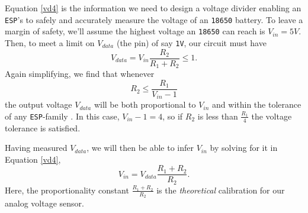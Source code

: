 Equation \ref{vd4} is the information we need to design a voltage divider enabling an \texttt{ESP}'s \adc to safely and accurately measure the voltage of an \texttt{18650} battery.
To leave a margin of safety, we'll assume the highest voltage an \texttt{18650} can reach is $V_{in}=5V$. Then, to meet a limit on $V_{data}$ (the \adc pin) of say \texttt{1V}, our circuit must have
\begin{equation}\label{vd5}
V_{data} = V_{in} \frac{R_2}{R_1+R_2}  \le 1 .
\end{equation}
Again simplifying, we find that whenever
\begin{equation}\label{vd6}
R_2 \le \frac{R_1}{V_{in}-1} %
\end{equation}
the output voltage $V_{data}$ will be both proportional to $V_{in}$ and within the tolerance of any \texttt{ESP}-family \adc.
In this case, $V_{in}-1 = 4$, so if $R_2$ is less than $\frac{R_1}{4}$ the voltage tolerance is satisfied.

Having measured $V_{data}$, we will then be able to infer $V_{in}$ by solving for it in Equation \ref{vd4},
\begin{equation}\label{vd7}
V_{in} = V_{data} \frac{R_1+R_2}{R_2}.
\end{equation}
Here, the proportionality constant $\frac{R_1+R_2}{R_2}$ is the \emph{theoretical} calibration for our analog voltage sensor.

